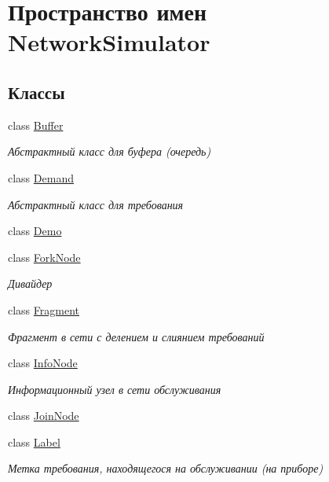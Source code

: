 \hypertarget{namespace_network_simulator}{}\section{Пространство имен Network\+Simulator}
\label{namespace_network_simulator}
\subsection*{Классы}
\begin{DoxyCompactItemize}
\item 
class \hyperlink{class_network_simulator_1_1_buffer}{Buffer}
\begin{DoxyCompactList}\small\item\em Абстрактный класс для буфера (очередь) \end{DoxyCompactList}\item 
class \hyperlink{class_network_simulator_1_1_demand}{Demand}
\begin{DoxyCompactList}\small\item\em Абстрактный класс для требования \end{DoxyCompactList}\item 
class \hyperlink{class_network_simulator_1_1_demo}{Demo}
\item 
class \hyperlink{class_network_simulator_1_1_fork_node}{Fork\+Node}
\begin{DoxyCompactList}\small\item\em Дивайдер \end{DoxyCompactList}\item 
class \hyperlink{class_network_simulator_1_1_fragment}{Fragment}
\begin{DoxyCompactList}\small\item\em Фрагмент в сети с делением и слиянием требований \end{DoxyCompactList}\item 
class \hyperlink{class_network_simulator_1_1_info_node}{Info\+Node}
\begin{DoxyCompactList}\small\item\em Информационный узел в сети обслуживания \end{DoxyCompactList}\item 
class \hyperlink{class_network_simulator_1_1_join_node}{Join\+Node}
\item 
class \hyperlink{class_network_simulator_1_1_label}{Label}
\begin{DoxyCompactList}\small\item\em Метка требования, находящегося на обслуживании (на приборе) \end{DoxyCompactList}\item 

\end{DoxyCompactItemize}
